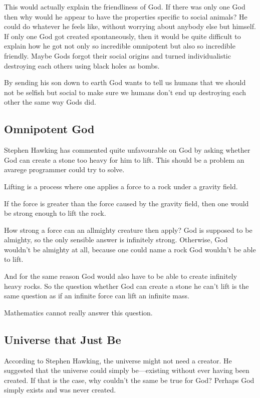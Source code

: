 This would actually explain the friendliness of God. 
If there was only one God then why would he appear to have the  properties specific to
social animals? He could do whatever he feels like, without
worrying about anybody  else but himself. If only one God got
created spontaneously, then it would  be quite difficult to
explain how he got not only so incredible  omnipotent but also so
incredible friendly. Maybe Gods forgot their  social origins and
turned individualistic destroying each others using black holes
as bombs.  
  
By sending his son down to earth God wants to tell us
humans that we should  not be selfish but social to make sure we
humans don't end up destroying  each other the same way Gods did. 


\subsection*{Omnipotent God}

Stephen Hawking has commented quite unfavourable on God 
by asking whether God can create a stone too heavy for him to lift.
This should be a problem an avarege programmer could try to solve.

Lifting is a process where one applies a force  to a rock under a gravity field.
  
If the force is greater than the force caused by the gravity field, then one would be strong enough to lift the rock. 
  
How strong a force can an allmighty creature then apply?  God is
supposed to be almighty, so the only sensible answer is infinitely
strong. Otherwise, God wouldn't be  almighty at all, because one
could name a rock God wouldn't be able to  lift.
  
And for the same reason God would also have to be able to create  infinitely heavy
rocks. So the question whether God can create a stone he can't lift
is  the same question as if an infinite force can lift an infinite
mass.

Mathematics cannot really answer this question. 
  

\subsection*{Universe that Just Be}

According to Stephen Hawking, the universe might not need a creator. He suggested that the universe could simply be—existing without ever having been created. If that is the case, why couldn't the same be true for God? Perhaps God simply exists and was never created.

